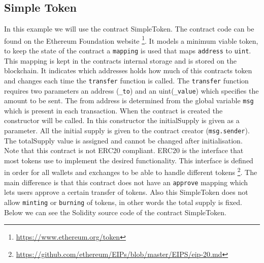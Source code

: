 \documentclass[a4paper]{article}
\begin{document}
\subsection{Simple Token}
In this example we will use the contract SimpleToken. The contract code can be found on the Ethereum Foundation website \footnote{\url{https://www.ethereum.org/token}}. 
It models a minimum viable token, to keep the state of the contract a \texttt{mapping} is used that maps \texttt{address} to \texttt{uint}. This mapping is kept in the contracts internal storage and is stored on the blockchain. It indicates which addresses holds how much of this contracts token and changes each time the \texttt{transfer} function is called. The \texttt{transfer} function requires two parameters an address (\texttt{\_to})  and an uint(\texttt{\_value}) which specifies the amount to be sent. The from address is determined from the global variable \texttt{msg} which is present in each transaction. When the contract is created the constructor will be called. In this constructor the initialSupply is given as a parameter. All the initial supply is given to the contract creator (\texttt{msg.sender}). The totalSupply value is assigned and cannot be changed after initialisation.\\
Note that this contract is not ERC20 compliant. ERC20 is the interface that most tokens use to implement the desired functionality. This interface is defined in order for all wallets and exchanges to be able to handle different tokens \footnote{\url{https://github.com/ethereum/EIPs/blob/master/EIPS/eip-20.md}}. The main difference is that this contract does not have an \texttt{approve} mapping which lets users approve a certain transfer of tokens. Also this SimpleToken does not allow \texttt{minting} or \texttt{burning} of tokens, in other words the total supply is fixed. Below we can see the Solidity source code of the contract SimpleToken.


\end{document}
